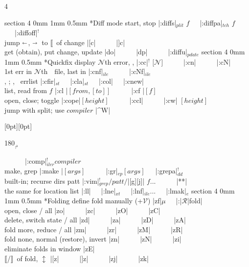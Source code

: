 \documentclass[10pt,a4paper,landscape]{article}
\makeatletter
\renewcommand{\subsection}{\@startsection
	{section}
	{4}
	{0mm}
	{1mm}
	{0.5mm}
	{\normalfont\bfseries\scriptsize}}
\newcommand{\ret}{{\hspace{0.2ex}\raisebox{0.5ex}[0pt][0pt]{
 \begin{rotate}{180}{$_\Rsh$}\end{rotate}} }}
\newcommand{\toleft}{$\shortleftarrow$}
\newcommand{\toright}{$\shortrightarrow$}
\newcommand{\tostart}{{\small\RewindToStart}}
\newcommand{\toend}{{\small\ForwardToEnd}}
\newcommand{\ibeg}{$\llbracket$}
\newcommand{\iend}{$\rrbracket$}
\newcommand{\begend}[1]{\ibeg/\iend~of #1}
\newcommand{\opt}[1]{$_{#1}$}
\newcommand{\Opt}[1]{$^{#1}$}
\newcommand{\OPT}[2]{$_{#1}^{#2}$}
\newcommand{\N}{{\footnotesize$\mathcal{N}$}}
\newcommand{\R}{{\footnotesize$\mathcal{R}$}}
\newcommand{\V}{{\footnotesize$\mathcal{V}$}}
\newcommand{\w}{{~~~}}
\newcommand{\next}{{\small\leftpointright}}
\newcommand{\prev}{{\small\rightpointleft}}
\makeatother
\begin{document}
\begin{multicols}{4}
{{\subsection*{Diff mode}
start, stop	    \dotfill|:diffs|\opt{plit} $f$\w|:diffpa|\opt{tch} $f$\w|:diffoff|\Opt{!}\\
jump \toleft, \toright~to \ibeg~of change   \dotfill|[c|\w\w|]c|\\
get (obtain), put change, update	    \dotfill|do|\w\w|dp|\w\w|:diffu|\opt{pdate}
\subsection*{Quickfix}
display {\N}th error, \next, \prev	    \dotfill|:cc|\Opt{!} $[$\N$]$\w\w|:cn|\w\w|:cN|\\
1st err in {\N}th~\next~file, last in \prev	    \dotfill|:cnf|\opt{ile}\w\w|:cNf|\opt{ile}\\
\tostart, \toend; \prev, \next~errlist	    \dotfill|:cfir|\opt{st}\w|:cla|\opt{st}\w|:col|\w|:cnew|\\
list, read from $f$			    \dotfill|:cl |$[from,[to]]$\w\w|:cf |$[f]$\\
open, close; toggle			    \dotfill|:cope|$[height]$\w\w|:ccl|\w\w|:cw| $[height]$\\
jump with split; use $compiler$		    \dotfill|^W|\ret\w\w|:comp|\OPT{iler}{!}$compiler$\\
make, grep			    \dotfill|:make |$[args]$\w\w|:gr|\opt{ep}$[args]$\w|:grepa|\OPT{dd}{!}\\
built-in; recurse dirs patt	\dotfill|:vim|\OPT{grep}{!}$/patt/$|[g][j]| $f$...\w\w|**|\\
the same for location list		    \dotfill|:ll|\w|:lne|\opt{xt}\w|:lnf|\opt{ile}...\w|:lmak|\opt{e}
\subsection*{Folding}
define fold manually (+\V)  \dotfill|zf|$\mu$\w|:|\R|fold|\\
open, close / all	    \dotfill|zo|\w\w|zc|\w\w|zO|\w\w|zC|\\
delete, switch state / all  \dotfill|zd|\w\w|za|\w\w|zD|\w\w|zA|\\
fold more, reduce / all	    \dotfill|zm|\w\w|zr|\w\w|zM|\w\w|zR|\\
fold none, normal (restore), invert \dotfill|zn|\w\w|zN|\w\w|zi|\\
eliminate folds in window   \dotfill|zE|\\
\begend{fold}, $\updownarrow$	\dotfill|[z|\w\w|]z|\w\w|zj|\w\w|zk|
}}
\end{multicols}
\end{document}
